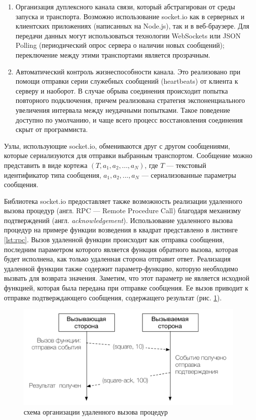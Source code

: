 \documentclass[a4paper,14pt,href,draft]{article}
\begin{document}
\begin{enumerate}
  \item Организация дуплексного канала связи, который абстрагирован от среды запуска и транспорта. Возможно использование
  socket.io как в серверных и клиентских приложениях (написанных на Node.js), так и в веб-браузере. Для передачи данных
  могут использоваться технологии WebSockets или JSON Polling (периодический опрос сервера о наличии новых сообщений);
  переключение между этими транспортами является прозрачным.

  \item Автоматический контроль жизнеспособности канала. Это реализовано при помощи отправки серии служебных сообщений
  (heartbeats) от клиента к серверу и наоборот. В случае обрыва соединения происходит попытка повторного подключения,
  причем реализована стратегия экспоненциального увеличения интервала между неудачными попытками. Такое поведение доступно
  по умолчанию, и чаще всего процесс восстановления соединения скрыт от программиста.
\end{enumerate}

Узлы, использующие socket.io, обмениваются друг с другом сообщениями, которые сериализуются для отправки выбранным
транспортом. Сообщение можно представить в виде кортежа $(T, a_1, a_2, ..., a_N)$, где $T$ --- текстовый идентификатор
типа сообщения, $a_1, a_2, ..., a_N $ --- сериализованные параметры сообщения.

Библиотека socket.io предоставляет также возможность реализации удаленного вызова процедур (англ. RPC --- Remote
Procedure Call) благодаря механизму подтверждений (англ. \textit{acknowledgement}). Использование удаленного вызова
процедур на примере функции возведения в квадрат представлено в листинге \ref{lst:rpc}. Вызов удаленной функции происходит
как отправка сообщения, последним параметром которого является функция обратного вызова, которая будет исполнена, как только
удаленная сторона отправит ответ. Реализация удаленной функции также содержит параметр-функцию, которую необходимо вызвать
для возврата значения. Заметим, что этот параметр не является исходной функцией, которая была передана при отправке
сообщения. Ее вызов приводит к отправке подтверждающего сообщения, содержащего результат (рис. \ref{fig:RpcSchema}).

\begin{figure}[htbp]
\begin{center}
  \includegraphics[scale=0.8]{rpc-schema.pdf}
    \caption{схема организации удаленного вызова процедур}
    \label{fig:RpcSchema}
\end{center}
\end{figure}
\end{document}
